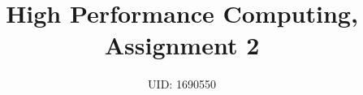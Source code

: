 \documentclass[11pt,journal]{article}
\begin{document}
	\title{High Performance Computing, Assignment 2}
	
	\author{UID: 1690550}%
	



	
	
	\maketitle
	
	
	
	
\end{document}
